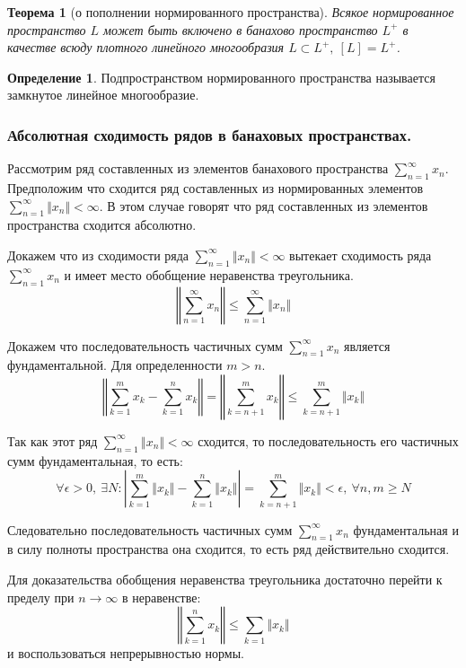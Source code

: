 \documentclass[14pt,a4paper]{extarticle}
\newtheorem{theorem}{Теорема}[section]
\theoremstyle{definition}
\newtheorem{definition}{Определение}[section]
\theoremstyle{remark}
\renewcommand{\[}{\begin{dmath*}[compact]}
\renewcommand{\]}{\end{dmath*}}
\newcommand{\sep}{ , \ \allowbreak }
\begin{document}
\begin{theorem}[о пополнении нормированного пространства]
\label{th:о пополнении нормированного пространства}
  Всякое нормированное пространство $L$ может быть включено в банахово
  пространство $L^+$ в качестве всюду плотного линейного многообразия
  $L \subset L^+ \sep [L]=L^+$.
\end{theorem}

\begin{definition}
  Подпространством нормированного пространства называется
  замкнутое линейное многообразие.
\end{definition}

\subsubsection{Абсолютная сходимость рядов в банаховых пространствах.}

Рассмотрим ряд составленных из элементов банахового пространства
$\sum_{n=1}^\infty x_n$.
Предположим что сходится ряд составленных из нормированных элементов
$\sum_{n=1}^\infty \Vert x_n \Vert < \infty$.
В этом случае говорят что ряд составленных из элементов пространства
сходится абсолютно.

Докажем что из сходимости ряда $\sum_{n=1}^\infty \Vert x_n \Vert < \infty$
вытекает сходимость ряда $\sum_{n=1}^\infty x_n$ и имеет место обобщение
неравенства треугольника.
\[ \left \Vert \sum_{n=1}^\infty x_n \right \Vert \leq
\sum_{n=1}^\infty \Vert x_n \Vert  \]

Докажем что последовательность частичных сумм $\sum_{n=1}^\infty x_n$ является
фундаментальной.
Для определенности $m>n$.
\[ {\left \Vert \sum_{k=1}^m x_k - \sum_{k=1}^n x_k \right \Vert} \allowbreak
= {\left \Vert \sum_{k=n+1}^m x_k \right \Vert} \allowbreak
\leq {\sum_{k=n+1}^m \Vert x_k \Vert} \]

Так как этот ряд $\sum_{n=1}^\infty \Vert x_n \Vert < \infty$ сходится,
то последовательность его частичных сумм фундаментальная, то есть:
\[ {\forall \epsilon > 0} \sep \exists N:
{\left| \sum_{k=1}^m \Vert x_k \Vert - \sum_{k=1}^n \Vert x_k \Vert \right|}
\allowbreak = {\sum_{k=n+1}^m \Vert x_k \Vert < \epsilon}
\sep {\forall n,m \geq N} \]

Следовательно последовательность частичных сумм $\sum_{n=1}^\infty x_n$
фундаментальная и в силу полноты пространства она сходится,
то есть ряд действительно сходится.

Для доказательства обобщения неравенства треугольника достаточно перейти к
пределу при $n \to \infty$ в неравенстве:
\[ \left \Vert \sum_{k=1}^n x_k \right \Vert \leq \sum_{k=1} \Vert x_k \Vert \]
и воспользоваться непрерывностью нормы.
\end{document}
